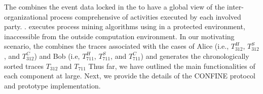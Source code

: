The  combines the event data locked in the  to have a global view of the inter-organizational process comprehensive of activities executed by each involved  party. .
 executes process mining algorithms using  in a protected environment, inaccessible from the outside computation environment.
In our motivating scenario, the  combines the traces associated with the cases of Alice (i.e., $T^H_{312}$, $T^S_{312}$, and $T^C_{312}$) and Bob (i.e, $T^H_{711}$, $T^S_{711}$, and $T^C_{711}$) and generates the chronologically sorted traces $T_{312}$ and $T_{711}$  Thus far, we have outlined the main functionalities of each component at large. Next, we provide the details of the CONFINE protocol and prototype implementation.



